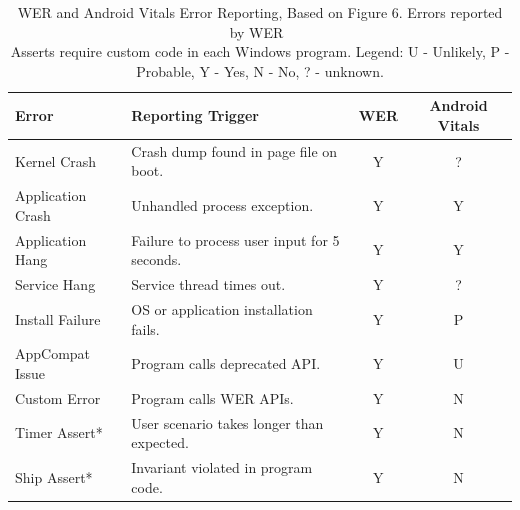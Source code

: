 \begin{table}
    \centering
    \small\addtolength{\tabcolsep}{-6pt} %
    \begin{tabular}{llcc}
         Error             &Reporting Trigger  &WER &Android Vitals \\
         \hline
         Kernel Crash      &Crash dump found in page file on boot. &Y &? \\ 
         Application Crash &Unhandled process exception. &Y &Y \\
         \hline
         Application Hang  &Failure to process user input for 5 seconds. &Y &Y \\
         Service Hang      &Service thread times out. &Y &? \\
         \hline
         Install Failure   &OS or application installation fails. &Y &P \\
         AppCompat Issue   &Program calls deprecated API. &Y &U \\
         Custom Error      &Program calls WER APIs. &Y &N \\
         \hline
         Timer Assert* &User scenario takes longer than expected. &Y &N \\
         Ship Assert* &Invariant violated in program code. &Y &N\\
    \end{tabular}
    \caption[WER and Android Vitals Error Reporting]{WER and Android Vitals Error Reporting, Based on Figure 6. Errors reported by WER~\citep{kinshuman2009_debugging_in_the_very_large} \\ \footnotesize *Asserts require custom code in each Windows program. Legend: U - Unlikely, P - Probable, Y - Yes, N - No, ? - unknown.}
    \label{tab:wer-and-android-vitals-errors}
\end{table}

